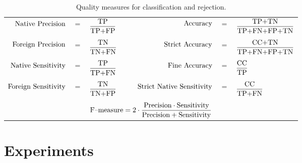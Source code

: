 \documentclass{llncs}
\begin{document}
\begin{table}[!tbp]
\vspace{-6pt}
\centering
\caption{Quality measures for classification and rejection.}
\vspace{-6pt}
{\footnotesize
\begin{tabular}{rclrcl}
  $\textnormal{Native Precision}$ &$=$& $\displaystyle\frac{\textnormal{TP}}{\textnormal{TP+FP}}$ & 
  $\textnormal{Accuracy}$ &$=$& $\displaystyle\frac{\textnormal{TP+TN}}{\textnormal{TP+FN+FP+TN}}$ \\
  &&&&&\vspace{-3pt}\\
  $\textnormal{Foreign Precision}$ &$=$& $\displaystyle\frac{\textnormal{TN}}{\textnormal{TN+FN}}$ &
  $\textnormal{Strict Accuracy}$ &$=$& $\displaystyle\frac{\textnormal{CC+TN}}{\textnormal{TP+FN+FP+TN}}$ \\
  &&&&&\vspace{-3pt}\\
  $\textnormal{Native Sensitivity}$ &$=$& $\displaystyle\frac{\textnormal{TP}}{\textnormal{TP+FN}}$ &
  $\textnormal{Fine Accuracy}$ &$=$& $\displaystyle\frac{\textnormal{CC}}{\textnormal{TP}}$ \\
  &&&&&\vspace{-3pt}\\
  $\textnormal{Foreign Sensitivity}$ &$=$& $\displaystyle\frac{\textnormal{TN}}{\textnormal{TN+FP}}$ &
  $\hspace{18pt}\textnormal{Strict Native Sensitivity}$ &$=$& $\displaystyle\frac{\textnormal{CC}}{\textnormal{TP+FN}}$\\
  &&&&&\vspace{-3pt}\\
  \multicolumn{6}{c}{$\textnormal{F--measure}=2\cdot\displaystyle\frac{\textnormal{Precision}\cdot\textnormal{Sensitivity}}{\textnormal{Precision}+\textnormal{Sensitivity}}$}
\end{tabular}
}
\label{tab:measures}
\vspace{-12pt}
\end{table}


\vspace{-12pt}
\section{Experiments}
  \label{sec:Experiments}
\vspace{-3pt}
\end{document}
